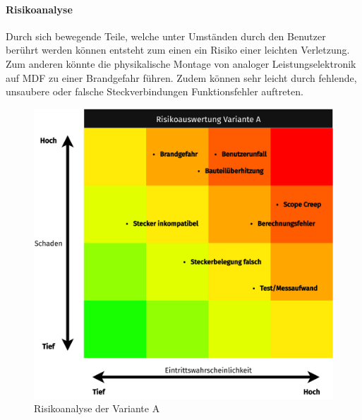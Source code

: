 \paragraph{Risikoanalyse}
Durch sich bewegende Teile, welche unter Umständen durch den Benutzer berührt werden können entsteht zum einen ein Risiko einer leichten Verletzung. Zum anderen könnte die physikalische Montage von analoger Leistungselektronik auf MDF zu einer Brandgefahr führen. Zudem können sehr leicht durch fehlende, unsaubere oder falsche Steckverbindungen Funktionsfehler auftreten.
\begin{figure}[H]
	\centering
	\includegraphics[width=\textwidth*4/5]{pictures/risks-Variante A_ Alles analog.png}
	\caption{Risikoanalyse der Variante A}
\end{figure}
\newpage
